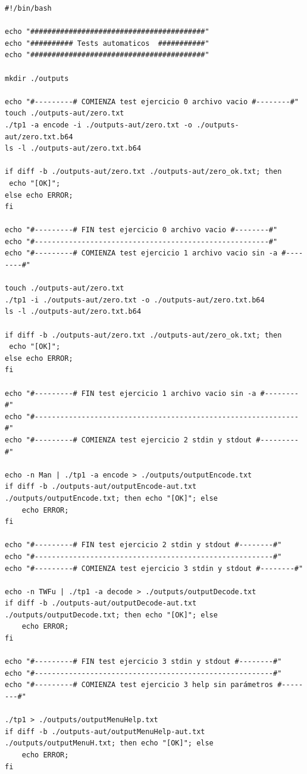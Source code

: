 \documentclass[11pt,a4paper]{article}
\begin{document}
\begin{lstlisting}
#!/bin/bash

echo "#########################################"
echo "########## Tests automaticos  ###########"
echo "#########################################"

mkdir ./outputs

echo "#---------# COMIENZA test ejercicio 0 archivo vacio #--------#"
touch ./outputs-aut/zero.txt
./tp1 -a encode -i ./outputs-aut/zero.txt -o ./outputs-aut/zero.txt.b64
ls -l ./outputs-aut/zero.txt.b64

if diff -b ./outputs-aut/zero.txt ./outputs-aut/zero_ok.txt; then
 echo "[OK]";
else echo ERROR;
fi

echo "#---------# FIN test ejercicio 0 archivo vacio #--------#"
echo "#-------------------------------------------------------#"
echo "#---------# COMIENZA test ejercicio 1 archivo vacio sin -a #--------#"

touch ./outputs-aut/zero.txt
./tp1 -i ./outputs-aut/zero.txt -o ./outputs-aut/zero.txt.b64
ls -l ./outputs-aut/zero.txt.b64

if diff -b ./outputs-aut/zero.txt ./outputs-aut/zero_ok.txt; then
 echo "[OK]";
else echo ERROR;
fi

echo "#---------# FIN test ejercicio 1 archivo vacio sin -a #--------#"
echo "#--------------------------------------------------------------#"
echo "#---------# COMIENZA test ejercicio 2 stdin y stdout #---------#"

echo -n Man | ./tp1 -a encode > ./outputs/outputEncode.txt
if diff -b ./outputs-aut/outputEncode-aut.txt ./outputs/outputEncode.txt; then echo "[OK]"; else
	echo ERROR;
fi

echo "#---------# FIN test ejercicio 2 stdin y stdout #--------#"
echo "#--------------------------------------------------------#"
echo "#---------# COMIENZA test ejercicio 3 stdin y stdout #--------#"

echo -n TWFu | ./tp1 -a decode > ./outputs/outputDecode.txt
if diff -b ./outputs-aut/outputDecode-aut.txt ./outputs/outputDecode.txt; then echo "[OK]"; else
	echo ERROR;
fi

echo "#---------# FIN test ejercicio 3 stdin y stdout #--------#"
echo "#--------------------------------------------------------#"
echo "#---------# COMIENZA test ejercicio 3 help sin parámetros #--------#"

./tp1 > ./outputs/outputMenuHelp.txt
if diff -b ./outputs-aut/outputMenuHelp-aut.txt ./outputs/outputMenuH.txt; then echo "[OK]"; else
	echo ERROR;
fi


\end{lstlisting}
\end{document}
